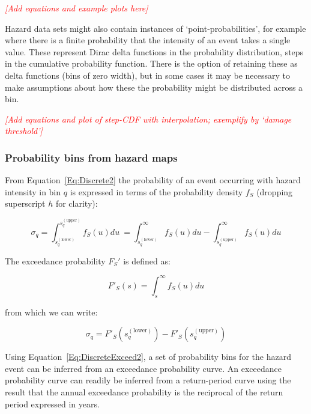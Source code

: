 \documentclass[a4paper,11pt]{extarticle} %
\theoremstyle{definition}
\begin{document}
{\textcolor{red}{\emph{[Add equations and example plots here]}}}

Hazard data sets might also contain instances of `point-probabilities', for example where there is a finite probability that the intensity of an event takes a single value. These represent Dirac delta functions in the probability distribution, steps in the cumulative probability function. There is the option of retaining these as delta functions (bins of zero width), but in some cases it may be necessary to make assumptions about how these the probability might be distributed across a bin.

{\textcolor{red}{\emph{[Add equations and plot of step-CDF with interpolation; exemplify by `damage threshold']}}}

\subsubsection{Probability bins from hazard maps}

From Equation~\ref{Eq:Discrete2} the probability of an event occurring with hazard intensity in bin $q$ is expressed in terms of the probability density $f_S$ (dropping superscript $h$ for clarity):

\begin{equation}
    \label{Eq:Discrete2Again}
    \sigma_q = \int_ {s^{(\text{lower})}_q}^{s^{(\text{upper})}_q} f_S(u) du \
    = \int_ {s^{(\text{lower})}_q}^{\infty} f_S(u) du - \int_ {s^{(\text{upper})}_q}^{\infty} f_S(u) du
\end{equation}

The exceedance probability $F_S'$ is defined as:

\begin{equation}
    \label{Eq:DiscreteExceed}
    F'_S(s) = \int_s^{\infty} f_S(u) du
\end{equation}

from which we can write:

\begin{equation}
    \label{Eq:DiscreteExceed2}
    \sigma_q = F'_S({s^{(\text{lower})}_q}) - F'_S({s^{(\text{upper})}_q})
\end{equation}

Using Equation~\ref{Eq:DiscreteExceed2}, a set of probability bins for the hazard event can be inferred from an exceedance probability curve. An exceedance probability curve can readily be inferred from a return-period curve using the result that the annual exceedance probability is the reciprocal of the return period expressed in years.
\end{document}
